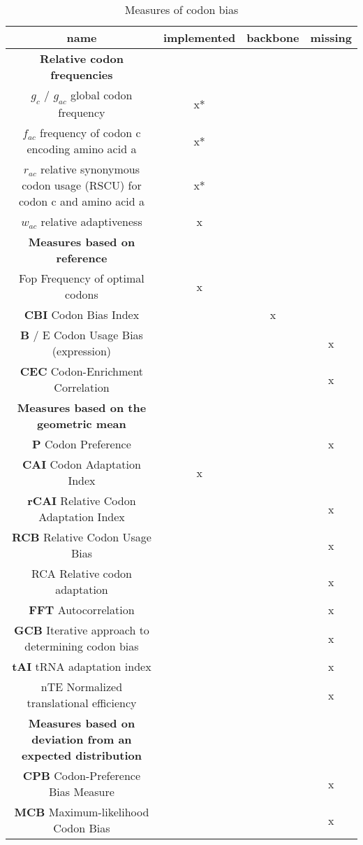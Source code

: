 \begin{table}[tb]
\begin{footnotesize}
\caption[Codon Bias Indices]{Measures of codon bias}
\label{tab:CodonBiasIndices}
\centering
\begin{tabular}{cccc}
\toprule
	name 	& implemented & backbone & missing	  \\ 
\midrule
\textbf{Relative codon frequencies} \\
	$g_c$ / $g_{ac}$ global codon frequency	& x* & & 	 \\
	$f_{ac}$	 frequency of codon c encoding amino acid a & x* & &	 \\
	$r_{ac}$ relative synonymous codon usage (RSCU) for codon c and amino acid a	& x* & &	 \\
	$w_{ac}$	 relative adaptiveness & x & & 	 \\
\midrule
\textbf{Measures based on reference} \\
	Fop	Frequency of optimal codons & x	 & & \\
	\textbf{CBI}	Codon Bias Index	& & x &	 \\
	\textbf{B} / E	Codon Usage Bias (expression) 	& & & x  \\
	\textbf{CEC}	Codon-Enrichment Correlation 	& & & x	 \\
\midrule	
\textbf{Measures based on the geometric mean} \\
	\textbf{P}	Codon Preference 	& & & x	 \\
	\textbf{CAI}	Codon Adaptation Index	& x & &	 \\ %
	\textbf{rCAI}	 Relative Codon Adaptation Index	& & & x	 \\ %
	\textbf{RCB}	Relative Codon Usage Bias	& & & x	 \\
	RCA Relative codon adaptation	& & & x	 \\
	\textbf{FFT} Autocorrelation	& & & x	 \\
	\textbf{GCB}	Iterative approach to determining codon bias	& & & x	 \\
	\textbf{tAI}	tRNA adaptation index	& & & x	 \\
	nTE	Normalized translational efficiency	& & & x	 \\
\midrule	
\textbf{Measures based on deviation from an expected distribution} \\
	\textbf{CPB}	Codon-Preference Bias Measure	& & & x	 \\
	\textbf{MCB}	Maximum-likelihood Codon Bias	& & & x	 \\

\end{tabular}
\end{footnotesize}
\end{table}
